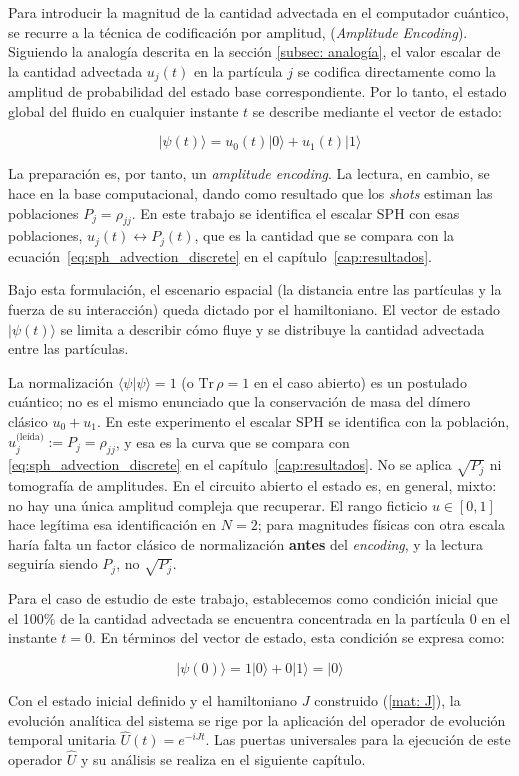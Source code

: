 Para introducir la magnitud de la cantidad advectada en el computador cuántico, se recurre a la técnica de codificación por amplitud, (\textit{Amplitude Encoding}). Siguiendo la analogía descrita en la sección \ref{subsec: analogía}, el valor escalar de la cantidad advectada $u_j(t)$ en la partícula $j$ se codifica directamente como la amplitud de probabilidad del estado base correspondiente. Por lo tanto, el estado global del fluido en cualquier instante $t$ se describe mediante el vector de estado:

\begin{equation}
    |\psi(t)\rangle = u_0(t)|0\rangle + u_1(t)|1\rangle
    \label{eq:estado_cuantico}
\end{equation}

La preparación es, por tanto, un \textit{amplitude encoding}. La lectura, en cambio, se hace en la base computacional, dando como resultado que los \textit{shots} estiman las poblaciones $P_j = \rho_{jj}$. En este trabajo se identifica el escalar SPH con esas poblaciones, $u_j(t) \leftrightarrow P_j(t)$, que es la cantidad que se compara con la ecuación~\eqref{eq:sph_advection_discrete} en el capítulo~\ref{cap:resultados}.

Bajo esta formulación, el escenario espacial (la distancia entre las partículas y la fuerza de su interacción) queda dictado por el hamiltoniano. El vector de estado $|\psi(t)\rangle$ se limita a describir cómo fluye y se distribuye la cantidad advectada entre las partículas.

La normalización $\langle\psi|\psi\rangle = 1$ (o $\mathrm{Tr}\,\rho = 1$ en el caso abierto) es un postulado cuántico; no es el mismo enunciado que la conservación de masa del dímero clásico $u_0 + u_1$. En este experimento el escalar SPH se identifica con la población, $u_j^{\text{(leída)}} := P_j = \rho_{jj}$, y esa es la curva que se compara con \eqref{eq:sph_advection_discrete} en el capítulo~\ref{cap:resultados}. No se aplica $\sqrt{P_j}$ ni tomografía de amplitudes. En el circuito abierto el estado es, en general, mixto: no hay una única amplitud compleja que recuperar. El rango ficticio $u \in [0,1]$ hace legítima esa identificación en $N=2$; para magnitudes físicas con otra escala haría falta un factor clásico de normalización \textbf{antes} del \textit{encoding}, y la lectura seguiría siendo $P_j$, no $\sqrt{P_j}$.

Para el caso de estudio de este trabajo, establecemos como condición inicial que el 100\% de la cantidad advectada se encuentra concentrada en la partícula 0 en el instante $t=0$. En términos del vector de estado, esta condición se expresa como:

\begin{equation}
    |\psi(0)\rangle = 1|0\rangle + 0|1\rangle = |0\rangle
    \label{eq:condicion_inicial}
\end{equation}

Con el estado inicial definido y el hamiltoniano $J$ construido (\ref{mat: J}), la evolución analítica del sistema se rige por la aplicación del operador de evolución temporal unitaria $\hat{U}(t) = e^{-i J t}$. Las puertas universales para la ejecución de este operador $\hat{U}$ y su análisis se realiza en el siguiente capítulo.


